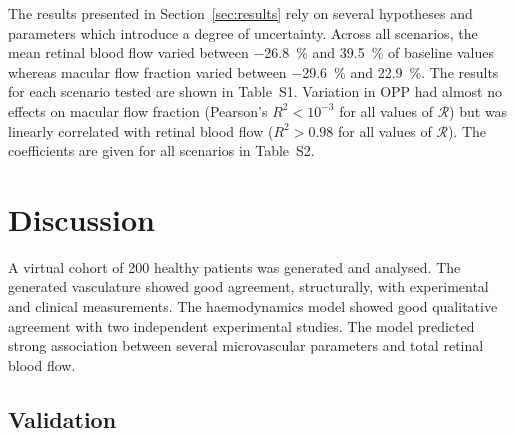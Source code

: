 \documentclass[11pt,]{article}
\begin{document}
The results presented in Section~\ref{sec:results} rely on several hypotheses and parameters which introduce a degree of uncertainty.
Across all scenarios, the mean retinal blood flow varied between \SI{-26.8}{\percent} and \SI{39.5}{\percent} of baseline values whereas macular flow fraction varied between \SI{-29.6}{\percent} and \SI{22.9}{\percent}.
The results for each scenario tested are shown in Table~S1.
Variation in OPP had almost no effects on macular flow fraction (Pearson's $R^2<10^{-3}$ for all values of $\mathcal R$) but was linearly correlated with retinal blood flow ($R^2>0.98$ for all values of $\mathcal R$).
The coefficients are given for all scenarios in Table~S2.

\section{Discussion}\label{sec:discussion}

A virtual cohort of 200 healthy patients was generated and analysed. 
The generated vasculature showed good agreement, structurally, with experimental and clinical measurements.
The haemodynamics model showed good qualitative agreement with two independent experimental studies.
The model predicted strong association between several microvascular parameters and total retinal blood flow.

\subsection{Validation}\label{sec:disc-validation}
\end{document}

